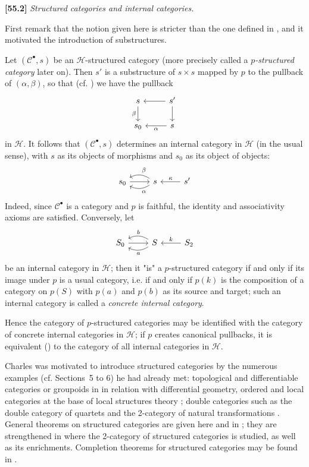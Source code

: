 \documentclass[a4paper,fleqn]{article}
\theoremstyle{plain}
\theoremstyle{definition}
\newenvironment{longcomm}[1]
  {\noindent\textbf{[#1]}\rmfamily}
  {}
\newcommand{\CC}{\mathcal{C}}
\newcommand{\HH}{\mathcal{H}}
\newcommand{\smallbullet}{\bullet}
\begin{document}
\begin{longcomm}{55.2}
  \emph{Structured categories and internal categories.}

  First remark that the notion given here is stricter than the one defined in \cite{coll57}, and it motivated the introduction of substructures.

  Let $(\CC^\smallbullet,s)$ be an $\HH$-structured category (more precisely called a \emph{$p$-structured category} later on).
  Then $s'$ is a substructure of $s\times s$ mapped by $p$ to the pullback of $(\alpha,\beta)$, so that (cf. \cite[Proposition~2.1]{coll109}) we have the pullback
  \[
    \begin{tikzcd}
      s \ar[d,swap,"\beta"]
      & s' \ar[l] \ar[d]
    \\s_0
      & s \ar[l,"\alpha"]
    \end{tikzcd}
  \]
  in $\HH$.
  It follows that $(\CC^\smallbullet,s)$ determines an internal category in $\HH$ (in the usual sense), with $s$ as its objects of morphisms and $s_0$ as its object of objects:
  \[
    \begin{tikzcd}
      s_0 \ar[r]
      & s \ar[l,bend left=30,"\alpha"] \ar[l,bend right=30,swap,"\beta"]
      & s' \ar[l,swap,"\kappa"]
    \end{tikzcd}
  \]
  Indeed, since $\CC^\smallbullet$ is a category and $p$ is faithful, the identity and associativity axioms are satisfied.
  Conversely, let
  \[
    \begin{tikzcd}
      S_0 \ar[r]
      & S \ar[l,bend left=30,"a"] \ar[l,bend right=30,swap,"b"]
      & S_2 \ar[l,swap,"k"]
    \end{tikzcd}
  \]
  be an internal category in $\HH$;
  then it "is" a $p$-structured category if and only if its image under $p$ is a usual category, i.e. if and only if $p(k)$ is the composition of a category on $p(S)$ with $p(a)$ and $p(b)$ as its source and target;
  such an internal category is called a \emph{concrete internal category}.

  Hence the category of $p$-structured categories may be identified with the category of concrete internal categories in $\HH$;
  if $p$ creates canonical pullbacks, it is equivalent (\cite{coll104}) to the category of all internal categories in $\HH$.

  Charles was motivated to introduce structured categories by the numerous examples (cf. Sections~5 to 6) he had already met: topological and differentiable categories or groupoids in \cite{coll28,coll50} in relation with differential geometry, ordered and local categories at the base of local structures theory \cite{coll47,coll53,coll55};
  double categories such as the double category of quartets \cite{coll55} and the 2-category of natural transformations \cite{coll52}.
  General theorems on structured categories are given here and in \cite{coll66,coll100};
  they are strengthened in \cite{coll109} where the 2-category of structured categories is studied, as well as its enrichments.
  Completion theorems for structured categories may be found in \cite{coll102}.


\end{longcomm}
\end{document}
